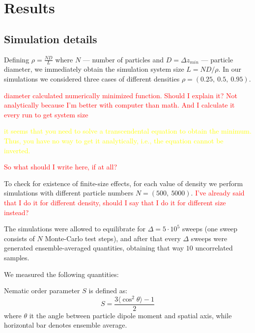 \section{Results}
\subsection{Simulation details}

Defining $\rho = \frac{N D}{L}$ where $N$ --- number of particles and $D = \Delta z_{min}$ --- particle diameter, we immediately obtain the simulation system size $L = N D/ \rho$. In our simulations we considered three cases of different densities $\rho = (0.25,\ 0.5,\ 0.95)$.

\textcolor{red}{diameter calculated numerically minimized function. Should I explain it? Not analytically because I'm better with computer than math. And I calculate it every run to get system size}

\textcolor{yellow}{it seems that you need to solve a transcendental equation to obtain the minimum. Thus, you have no way to get it analytically, i.e., the equation cannot be inverted.}

\textcolor{red}{So what should I write here, if at all?}

To check for existence of finite-size effects, for each value of density we perform simulations with different particle numbers $N = (500,\ 5000)$. \textcolor{red}{I've already said that I do it for different density, should I say that I do it for different size instead?}

The simulations were allowed to equilibrate for $\Delta = 5 \cdot 10^5$ sweeps (one sweep consists of $N$ Monte-Carlo test steps), and after that every $\Delta$ sweeps were generated ensemble-averaged quantities, obtaining that way $10$ uncorrelated samples. 


We measured the following quantities:

Nematic order parameter $S$ is defined as:
\begin{equation}
\label{eq:nematic_order_parameter}
	S = \frac{3 \langle\cos^2 \theta\rangle - 1}{2}
\end{equation}
where $\theta$ it the angle between particle dipole moment and spatial axis, while horizontal bar denotes ensemble average.


